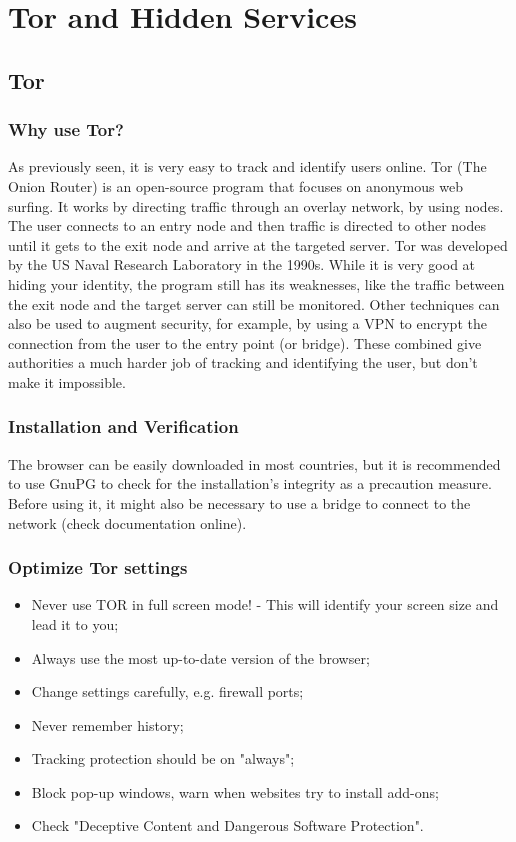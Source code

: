 \documentclass[11pt,a4paper]{report}
\begin{document}
\chapter{Tor and Hidden Services}
\section{Tor}
\subsection{Why use Tor?}
As previously seen, it is very easy to track and identify users online. Tor (The Onion Router) is an open-source program that focuses on anonymous web surfing. It works by directing traffic through an overlay network, by using nodes. The user connects to an entry node and then traffic is directed to other nodes until it gets to the exit node and arrive at the targeted server.
Tor was developed by the US Naval Research Laboratory in the 1990s.
While it is very good at hiding your identity, the program still has its weaknesses, like the traffic between the exit node and the target server can still be monitored.
Other techniques can also be used to augment security, for example, by using a VPN to encrypt the connection from the user to the entry point (or bridge). These combined give authorities a much harder job of tracking and identifying the user, but don't make it impossible.
\subsection{Installation and Verification}
The browser can be easily downloaded in most countries, but it is recommended to use GnuPG to check for the installation's integrity as a precaution measure. Before using it, it might also be necessary to use a bridge to connect to the network (check documentation online).
\subsection{Optimize Tor settings}
\begin{itemize}
    \item Never use TOR in full screen mode! - This will identify your screen size and lead it to you;
    \item Always use the most up-to-date version of the browser;
    \item Change settings carefully, e.g. firewall ports;
    \item Never remember history;
    \item Tracking protection should be on "always";
    \item Block pop-up windows, warn when websites try to install add-ons;
    \item Check "Deceptive Content and Dangerous Software Protection".
\end{itemize}
\end{document}

